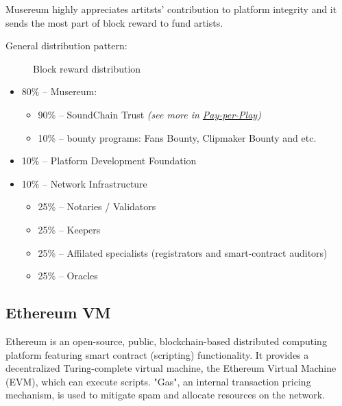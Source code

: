 \documentclass[12pt]{report}
\newcommand{\hlc}[1]{\colorbox{yellow!25}{#1}}
\begin{document}
Musereum highly appreciates artitsts' contribution to platform integrity and it sends the most part of block reward to fund artists.

General distribution pattern:

\def\Musereum{Musereum}
\def\Development{Platform Development}
\def\Infrastructure{Infrastructure}

\begin{figure}[H]
\centering
\caption{Block reward distribution}
\vspace{20pt}
\end{figure}

\begin{itemize}
	\item 80\% – Musereum:
	\begin{itemize}
		\item 90\% – SoundChain Trust \textit{(see more in \hyperref[tech-apps-soundchain-payperplay]{Pay-per-Play})}
		\item 10\% – bounty programs: Fans Bounty, Clipmaker Bounty and etc.
	\end{itemize}
	\item 10\% – Platform Development Foundation
	\item 10\% – \hlc{Network Infrastructure}
	\begin{itemize}
		\item 25\% – Notaries / Validators
		\item 25\% – \hlc{Keepers}
		\item 25\% – Affilated specialists (\hlc{registrators} and smart-contract auditors)
		\item 25\% – Oracles
	\end{itemize}
\end{itemize}


\subsection{Ethereum VM}
\label{tech-blockchain-evm}
Ethereum is an open-source, public, blockchain-based distributed computing platform featuring smart contract (scripting) functionality. It provides a decentralized Turing-complete virtual machine, the Ethereum Virtual Machine (EVM), which can execute scripts. "Gas", an internal transaction pricing mechanism, is used to mitigate spam and allocate resources on the network.
\end{document}
